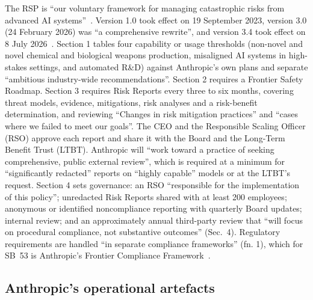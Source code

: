 \documentclass[11pt]{article}
\begin{document}
The RSP is ``our voluntary framework for managing catastrophic risks from advanced AI systems''~\cite[Introduction]{anthropic2026rsp}. Version 1.0 took effect on 19 September 2023, version 3.0 (24 February 2026) was ``a comprehensive rewrite'', and version 3.4 took effect on 8 July 2026~\cite{anthropic2026rsppage}. Section 1 tables four capability or usage thresholds (non-novel and novel chemical and biological weapons production, misaligned AI systems in high-stakes settings, and automated R\&D) against Anthropic's own plans and separate ``ambitious industry-wide recommendations''. Section 2 requires a Frontier Safety Roadmap. Section 3 requires Risk Reports every three to six months, covering threat models, evidence, mitigations, risk analyses and a risk-benefit determination, and reviewing ``Changes in risk mitigation practices'' and ``cases where we failed to meet our goals''. The CEO and the Responsible Scaling Officer (RSO) approve each report and share it with the Board and the Long-Term Benefit Trust (LTBT). Anthropic will ``work toward a practice of seeking comprehensive, public external review'', which is required at a minimum for ``significantly redacted'' reports on ``highly capable'' models or at the LTBT's request. Section 4 sets governance: an RSO ``responsible for the implementation of this policy''; unredacted Risk Reports shared with at least 200 employees; anonymous or identified noncompliance reporting with quarterly Board updates; internal review; and an approximately annual third-party review that ``will focus on procedural compliance, not substantive outcomes'' (Sec.~4). Regulatory requirements are handled ``in separate compliance frameworks'' (fn. 1), which for SB~53 is Anthropic's Frontier Compliance Framework~\cite{anthropic2025fcf}.

\subsection{Anthropic's operational artefacts}\label{sec:artefacts}
\end{document}
